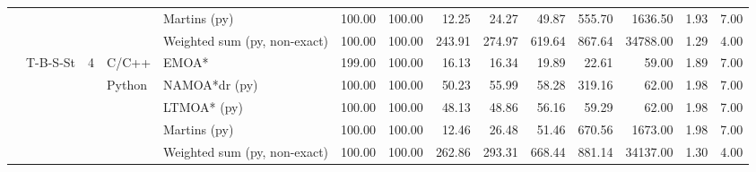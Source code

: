 \begin{table}
\begin{tabular}{lllllrrrrrrrrr}
{{ &  &  &  & Martins (py) & 100.00 & 100.00 & 12.25 & 24.27 & 49.87 & 555.70 & 1636.50 & 1.93 & 7.00 \\
 &  &  &  & Weighted sum (py, non-exact) & 100.00 & 100.00 & 243.91 & 274.97 & 619.64 & 867.64 & 34788.00 & 1.29 & 4.00 \\
\cline{2-14} \cline{3-14} \cline{4-14}
 & \multirow[t]{5}{*}{T-B-S-St} & \multirow[t]{5}{*}{4} & C/C++ & EMOA* & 199.00 & 100.00 & 16.13 & 16.34 & 19.89 & 22.61 & 59.00 & 1.89 & 7.00 \\
\cline{4-14}
 &  &  & \multirow[t]{4}{*}{Python} & NAMOA*dr (py) & 100.00 & 100.00 & 50.23 & 55.99 & 58.28 & 319.16 & 62.00 & 1.98 & 7.00 \\
 &  &  &  & LTMOA* (py) & 100.00 & 100.00 & 48.13 & 48.86 & 56.16 & 59.29 & 62.00 & 1.98 & 7.00 \\
 &  &  &  & Martins (py) & 100.00 & 100.00 & 12.46 & 26.48 & 51.46 & 670.56 & 1673.00 & 1.98 & 7.00 \\
 &  &  &  & Weighted sum (py, non-exact) & 100.00 & 100.00 & 262.86 & 293.31 & 668.44 & 881.14 & 34137.00 & 1.30 & 4.00 \\
\cline{1-14} \cline{2-14} \cline{3-14} \cline{4-14}
\bottomrule
\end{tabular}
\end{table}
